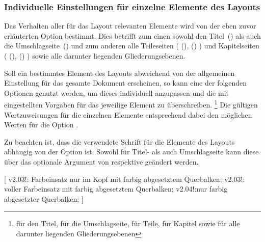 \begin{DeclareEntity*}{}
\begin{DeclareEntity*}{}
\begin{DeclareEntity*}{}
\subsubsection{Individuelle Einstellungen für einzelne Elemente des Layouts}

\newcommand*\cdalias{false,true,lightcolor,barcolor,bicolor,color,fullcolor}%
Das Verhalten aller für das Layout relevanten Elemente wird von der eben zuvor 
erläuterten Option  bestimmt. Dies betrifft zum einen sowohl 
den Titel~() als auch die Umschlagseite~() 
und zum anderen alle Teileseiten (%
  (), ()%
) und Kapitelseiten (%
  (), ()%
) sowie alle darunter liegenden Gliederungsebenen.

Soll ein bestimmtes Element des Layouts abweichend von der allgemeinen 
Einstellung für das gesamte Dokument erscheinen, so kann eine der folgenden 
Optionen genutzt werden, um dieses individuell anzupassen und die mit 
 eingestellten Vorgaben für das jeweilige Element zu 
überschreiben.%
\footnote{%
   für den Titel,  für die Umschlagseite,
   für Teile,  für Kapitel sowie
   für alle darunter liegenden Gliederungsebenen%
}
Die gültigen Wertzuweisungen für die einzelnen Elemente entsprechend dabei den 
möglichen Werten für die Option . 

Zu beachten ist, dass die verwendete Schrift für die Elemente des Layouts 
abhängig von der Option  ist. Sowohl für Titel- als auch
Umschlagseite kann diese über das optionale Argument von  
respektive  geändert werden.

\begin{Declaration}
  {}
[%
  v2.03!:%
    Farbeinsatz nur im Kopf mit farbig abgesetztem Querbalken;
  v2.03!:%
    voller Farbeinsatz mit farbig abgesetztem Querbalken;
  v2.04!:nur farbig abgesetzter Querbalken;%
]
\printdeclarationlist[Titel|?]


\end{Declaration}
\end{DeclareEntity*}
\end{DeclareEntity*}
\end{DeclareEntity*}
